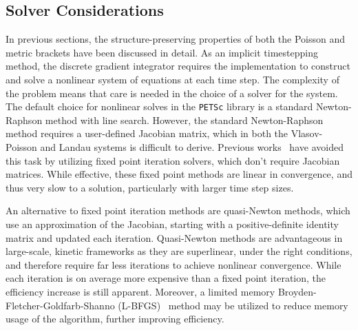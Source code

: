\documentclass[preprint,12pt]{elsarticle}
\theoremstyle{definition}
\begin{document}

\subsection{Solver Considerations}\label{sec:SolverConsiderations}
In previous sections, the structure-preserving properties of both the Poisson and metric brackets have been discussed in detail. As an implicit timestepping method, the discrete gradient integrator requires the implementation to construct and solve a nonlinear system of equations at each time step. The complexity of the problem means that care is needed in the choice of a solver for the system. The default choice for nonlinear solves in the \texttt{PETSc} library is a standard Newton-Raphson method with line search. However, the standard Newton-Raphson method requires a user-defined Jacobian matrix, which in both the Vlasov-Poisson and Landau systems is difficult to derive. Previous works~\cite{Hu2024} have avoided this task by utilizing fixed point iteration solvers, which don't require Jacobian matrices. While effective, these fixed point methods are linear in convergence, and thus very slow to a solution, particularly with larger time step sizes. 

An alternative to fixed point iteration methods are quasi-Newton methods, which use an approximation of the Jacobian, starting with a positive-definite identity matrix and updated each iteration. Quasi-Newton methods are advantageous in large-scale, kinetic frameworks as they are superlinear, under the right conditions, and therefore require far less iterations to achieve nonlinear convergence. While each iteration is on average more expensive than a fixed point iteration, the efficiency increase is still apparent. Moreover, a limited memory Broyden-Fletcher-Goldfarb-Shanno (L-BFGS)~\cite{Broyden1970,Nocedal1980} method may be utilized  to reduce memory usage of the algorithm, further improving efficiency.
\end{document}
